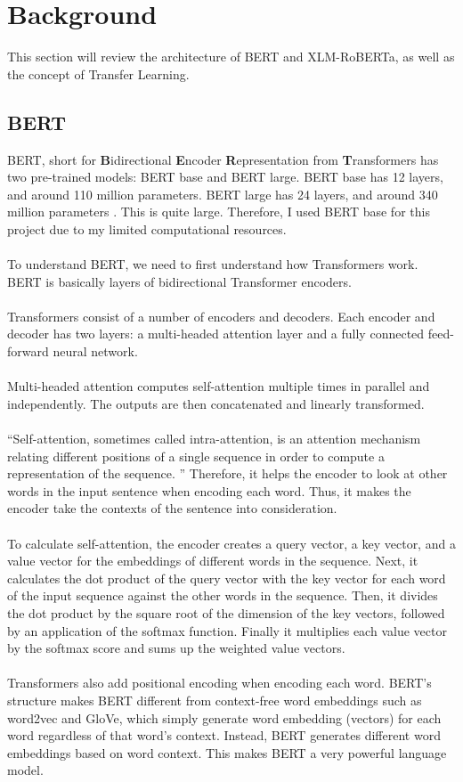 \documentclass[11pt,a4paper]{article}
\begin{document}
\section{Background}

This section will review the architecture of BERT and XLM-RoBERTa, as well as the concept of Transfer Learning.

\subsection{BERT} 

BERT, short for \textbf{B}idirectional \textbf{E}ncoder \textbf{R}epresentation from \textbf{T}ransformers has two pre-trained models: BERT base and BERT large. BERT base has 12 layers, and around 110 million parameters. BERT large has 24 layers, and around 340 million parameters \cite{BERT}. This is quite large. Therefore, I used BERT base for this project due to my limited computational resources.\\
\\
To understand BERT, we need to first understand how Transformers work. BERT is basically layers of bidirectional Transformer encoders.\\
\\
Transformers consist of a number of encoders and decoders. Each encoder and decoder has two layers: a multi-headed attention layer and a fully connected feed-forward neural network.\\
\\
Multi-headed attention computes self-attention multiple times in parallel and independently. The outputs are then concatenated and linearly transformed.\\
\\
“Self-attention, sometimes called intra-attention, is an attention mechanism relating different positions of a single sequence in order to compute a representation of the sequence. \cite{attention}” Therefore, it helps the encoder to look at other words in the input sentence when encoding each word. Thus, it makes the encoder take the contexts of the sentence into consideration.\\
\\
To calculate self-attention, the encoder creates a query vector, a key vector, and a value vector for the embeddings of different words in the sequence. Next, it calculates the dot product of the query vector with the key vector for each word of the input sequence against the other words in the sequence. Then, it divides the dot product by the square root of the dimension of the key vectors, followed by an application of the softmax function. Finally it multiplies each value vector by the softmax score and sums up the weighted value vectors.\\
\\
Transformers also add positional encoding when encoding each word. BERT’s structure makes BERT different from context-free word embeddings such as word2vec and GloVe, which simply generate word embedding (vectors) for each word regardless of that word's context. Instead, BERT generates different word embeddings based on word context. This makes BERT a very powerful language model.\\
\end{document}
